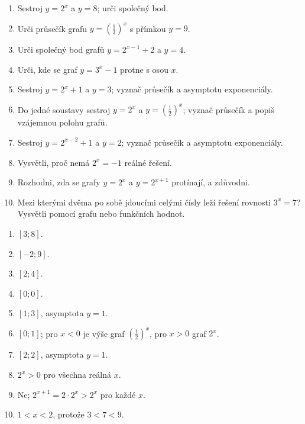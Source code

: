 \documentclass[11pt,a4paper]{article}
\begin{document}
\begin{zadaniReseniBox}[title={Domácí úkol}]
\begin{enumerate}[label=\alph*)]
  \item Sestroj $y=2^x$ a $y=8$; urči společný bod.
  \item Urči průsečík grafu $y=\left(\frac{1}{3}\right)^x$ s přímkou $y=9$.
  \item Urči společný bod grafů $y=2^{x-1}+2$ a $y=4$.
  \item Urči, kde se graf $y=3^x-1$ protne s osou $x$.
  \item Sestroj $y=2^x+1$ a $y=3$; vyznač průsečík a asymptotu exponenciály.
  \item Do jedné soustavy sestroj $y=2^x$ a $y=\left(\frac{1}{2}\right)^x$; vyznač průsečík a popiš vzájemnou polohu grafů.
  \item Sestroj $y=2^{x-2}+1$ a $y=2$; vyznač průsečík a asymptotu exponenciály.
  \item Vysvětli, proč nemá $2^x=-1$ reálné řešení.
  \item Rozhodni, zda se grafy $y=2^x$ a $y=2^{x+1}$ protínají, a zdůvodni.
  \item Mezi kterými dvěma po sobě jdoucími celými čísly leží řešení rovnosti $3^x=7$? Vysvětli pomocí grafu nebo funkčních hodnot.
\end{enumerate}
\tcblower
\begin{enumerate}[label=\alph*)]
  \item $[3;8]$.
  \item $[-2;9]$.
  \item $[2;4]$.
  \item $[0;0]$.
  \item $[1;3]$, asymptota $y=1$.
  \item $[0;1]$; pro $x<0$ je výše graf $\left(\frac{1}{2}\right)^x$, pro $x>0$ graf $2^x$.
  \item $[2;2]$, asymptota $y=1$.
  \item $2^x>0$ pro všechna reálná $x$.
  \item Ne; $2^{x+1}=2\cdot2^x>2^x$ pro každé $x$.
  \item $1<x<2$, protože $3<7<9$.
\end{enumerate}
\end{zadaniReseniBox}

\end{document}
